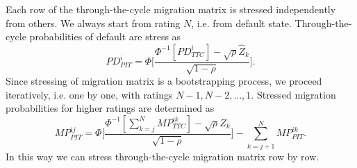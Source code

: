 \documentclass[a4paper]{article}
\begin{document}
Each row of the through-the-cycle migration matrix is stressed independently from others. We always start from rating $N$, i.e. from default state. Through-the-cycle probabilities of default are stress as
\begin{equation}
PD_{PIT}^i = \Phi \Big[\frac{\Phi^{-1}[PD^i_{TTC}] - \sqrt{\rho} \hat{Z}_k}{\sqrt{1 - \rho}}\Big].
\end{equation}
Since stressing of migration matrix is a bootstrapping process, we proceed iteratively, i.e. one by one, with ratings $N-1, N-2, ..., 1$. Stressed migration probabilities for higher ratings are determined as
\begin{equation}
MP_{PIT}^{ij} = \Phi \Big[\frac{\Phi^{-1}[\sum_{k = j}^N MP^{ik}_{TTC}] - \sqrt{\rho} \hat{Z}_k}{\sqrt{1 - \rho}}\Big] - \sum_{k = j + 1}^N MP_{PIT}^{ik}.
\end{equation}
In this way we can stress through-the-cycle migration matrix row by row.
\end{document}
